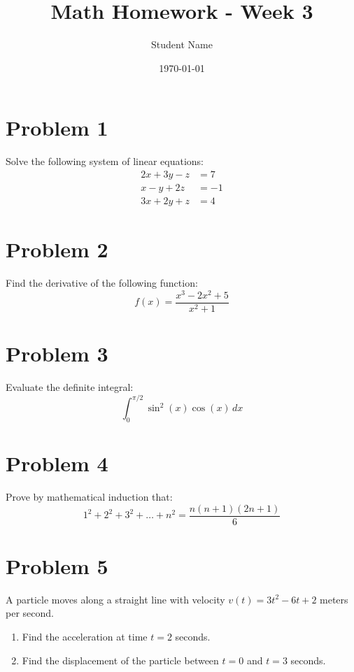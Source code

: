 \documentclass{article}
\title{Math Homework - Week 3}
\author{Student Name}
\date{\today}
\begin{document}
\maketitle

\section*{Problem 1}
Solve the following system of linear equations:
\begin{align}
2x + 3y - z &= 7 \\
x - y + 2z &= -1 \\
3x + 2y + z &= 4
\end{align}

\section*{Problem 2}
Find the derivative of the following function:
\[f(x) = \frac{x^3 - 2x^2 + 5}{x^2 + 1}\]

\section*{Problem 3}
Evaluate the definite integral:
\[\int_0^{\pi/2} \sin^2(x) \cos(x) \, dx\]

\section*{Problem 4}
Prove by mathematical induction that:
\[1^2 + 2^2 + 3^2 + \ldots + n^2 = \frac{n(n+1)(2n+1)}{6}\]

\section*{Problem 5}
A particle moves along a straight line with velocity $v(t) = 3t^2 - 6t + 2$ meters per second.
\begin{enumerate}
\item Find the acceleration at time $t = 2$ seconds.
\item Find the displacement of the particle between $t = 0$ and $t = 3$ seconds.
\end{enumerate}
\end{document}
